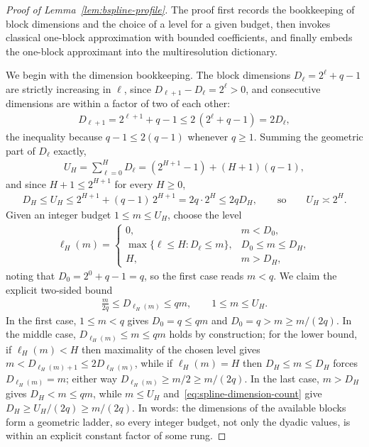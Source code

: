 \begin{proof}[Proof of Lemma~\ref{lem:bspline-profile}]
The proof first records the bookkeeping of block dimensions and the choice of a level for a given budget, then invokes classical one-block approximation with bounded coefficients, and finally embeds the one-block approximant into the multiresolution dictionary.

We begin with the dimension bookkeeping. The block dimensions $D_\ell=2^\ell+q-1$ are strictly increasing in $\ell$, since $D_{\ell+1}-D_\ell=2^\ell>0$, and consecutive dimensions are within a factor of two of each other:
\begin{align*}
D_{\ell+1}=2^{\ell+1}+q-1\leq2\,(2^\ell+q-1)=2D_\ell ,
\end{align*}
the inequality because $q-1\leq2(q-1)$ whenever $q\geq1$. Summing the geometric part of $D_\ell$ exactly,
\begin{align*}
U_H=\sum_{\ell=0}^HD_\ell
=(2^{H+1}-1)+(H+1)(q-1),
\end{align*}
and since $H+1\leq2^{H+1}$ for every $H\geq0$,
\begin{align}
D_H\leq U_H\leq2^{H+1}+(q-1)\,2^{H+1}=2q\cdot2^H\leq2qD_H,
\qquad\text{so}\qquad U_H\asymp2^H .
\label{eq:spline-dimension-count}
\end{align}
Given an integer budget $1\leq m\leq U_H$, choose the level
\begin{align*}
\ell_H(m)=
\begin{cases}
0,&m<D_0,\\
\max\{\ell\leq H:D_\ell\leq m\},&D_0\leq m\leq D_H,\\
H,&m>D_H,
\end{cases}
\end{align*}
noting that $D_0=2^0+q-1=q$, so the first case reads $m<q$. We claim the explicit two-sided bound
\begin{align}
\frac{m}{2q}\leq D_{\ell_H(m)}\leq qm,
\qquad1\leq m\leq U_H .
\label{eq:nearest-spline-level}
\end{align}
In the first case, $1\leq m<q$ gives $D_0=q\leq qm$ and $D_0=q>m\geq m/(2q)$. In the middle case, $D_{\ell_H(m)}\leq m\leq qm$ holds by construction; for the lower bound, if $\ell_H(m)<H$ then maximality of the chosen level gives $m<D_{\ell_H(m)+1}\leq2D_{\ell_H(m)}$, while if $\ell_H(m)=H$ then $D_H\leq m\leq D_H$ forces $D_{\ell_H(m)}=m$; either way $D_{\ell_H(m)}\geq m/2\geq m/(2q)$. In the last case, $m>D_H$ gives $D_H<m\leq qm$, while $m\leq U_H$ and~\eqref{eq:spline-dimension-count} give $D_H\geq U_H/(2q)\geq m/(2q)$. In words: the dimensions of the available blocks form a geometric ladder, so every integer budget, not only the dyadic values, is within an explicit constant factor of some rung.


\end{proof}
